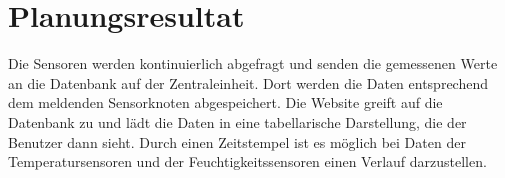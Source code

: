 \section{Planungsresultat}
Die Sensoren werden kontinuierlich abgefragt und senden die gemessenen Werte an
die Datenbank auf der Zentraleinheit. Dort werden die Daten entsprechend dem
meldenden Sensorknoten abgespeichert. Die Website greift auf die Datenbank zu
und lädt die Daten in eine tabellarische Darstellung, die der Benutzer dann
sieht. Durch einen Zeitstempel ist es möglich bei Daten der Temperatursensoren
und der Feuchtigkeitssensoren einen Verlauf darzustellen.
